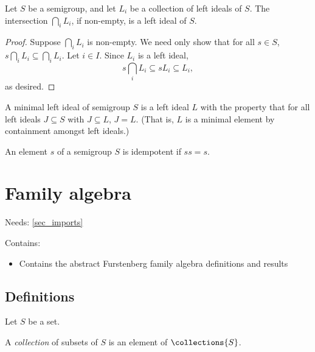 \begin{lemma}
    \label{lemma_intersection_of_ideals_is_ideal}
    \leanok{}
    Let $S$ be a semigroup, and let $L_i$ be a collection of left ideals of $S$.  The intersection $\bigcap_i L_i$, if non-empty, is a left ideal of $S$.
\end{lemma}

\begin{proof}
\leanok{}
    Suppose $\bigcap_i L_i$ is non-empty.  We need only show that for all $s \in S$, $s\bigcap_i L_i \subseteq \bigcap_i L_i$.  Let $i \in I$.  Since $L_i$ is a left ideal,
    \[s \bigcap_i L_i \subseteq s L_i \subseteq L_i,\]
    as desired.
\end{proof}

\begin{definition}
    \leanok{}
    A minimal left ideal of semigroup $S$ is a left ideal $L$ with the property that for all left ideals $J \subseteq S$ with $J \subseteq L$, $J = L$.  (That is, $L$ is a minimal element by containment amongst left ideals.)
\end{definition}

\begin{definition}[Idempotent]
    \mathlibok{}
    An element $s$ of a semigroup $S$ is idempotent if $ss = s$.
\end{definition}


\section{Family algebra}
\label{sec_family_algebra}

Needs: \cref{sec_imports}

Contains:
\begin{itemize}
    \item Contains the abstract Furstenberg family algebra definitions and results
\end{itemize}

\subsection{Definitions}

Let $S$ be a set.

\begin{definition}[Collection]
    A \emph{collection} of subsets of $S$ is an element of $\collections{S}$.
\end{definition}

